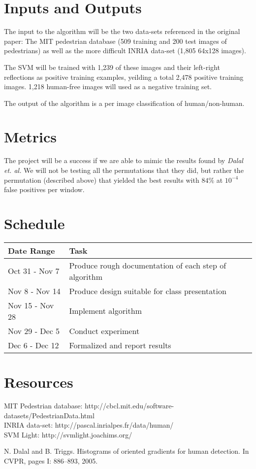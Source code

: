 \documentclass[a4paper,11pt]{article}
\begin{document}
\section{Inputs and Outputs}
The input to the algorithm will be the two data-sets referenced in the original paper: 
The MIT pedestrian database (509 training and 200 test images of pedestrians) as well 
as the more difficult INRIA data-set (1,805 64x128 images).

The SVM will be trained with 1,239 of these images and their left-right reflections as positive training examples,
yeilding a total 2,478 positive training images. 1,218 human-free images will used as a negative training set.

The output of the algorithm is a per image classification of human/non-human.

\section{Metrics} %
The project will be a success if we are able to mimic the results found by \emph{Dalal et. al.} 
We will not be testing all the permutations that they did, but rather the permutation 
(described above) that yielded the best results with $84\%$ at $10^{-4}$ false positives per window.

\section{Schedule} %
\begin{tabular}{|l|l|}
\hline
Date Range & Task \\
\hline
Oct 31 - Nov  7 & Produce rough documentation of each step of algorithm \\
Nov  8 - Nov 14 & Produce design suitable for class presentation \\
Nov 15 - Nov 28 & Implement algorithm \\
Nov 29 - Dec  5 & Conduct experiment \\
Dec  6 - Dec 12 & Formalized and report results \\
\hline
\end{tabular}

\section{Resources} %
MIT Pedestrian database: http://cbcl.mit.edu/software-datasets/PedestrianData.html \\
INRIA data-set: http://pascal.inrialpes.fr/data/human/ \\
SVM Light: http://svmlight.joachims.org/ \\

\begin{thebibliography}{1}

   N. Dalal and B. Triggs. Histograms of oriented gradients for human detection. 
  In CVPR, pages I: 886–893, 2005.

\end{thebibliography}
\end{document}
